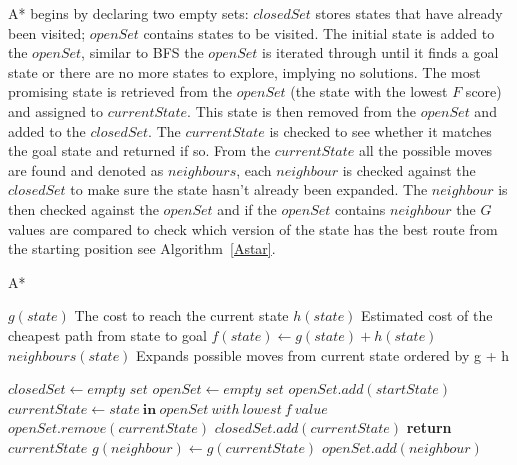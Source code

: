 \documentclass[final]{cmpreport}
\begin{document}
A* begins by declaring two empty sets: $closedSet$ stores states that have already been visited; $openSet$ contains states to be visited. The initial state is added to the $openSet$, similar to BFS the $openSet$ is iterated through until it finds a goal state or there are no more states to explore, implying no solutions. The most promising state is retrieved from the $openSet$ (the state with the lowest $F$ score) and assigned to $currentState$. This state is then removed from the $openSet$ and added to the $closedSet$. The $currentState$ is checked to see whether it matches the goal state and returned if so. From the $currentState$ all the possible moves are found and denoted as $neighbours$, each $neighbour$ is checked against the $closedSet$ to make sure the state hasn't already been expanded. The $neighbour$ is then checked against the $openSet$ and if the $openSet$ contains $neighbour$ the $G$ values are compared to check which version of the state has the best route from the starting position see Algorithm~\ref{Astar}.


	\begin{algorithm}
	\caption{A*}\label{Astar}
	\begin{algorithmic}[1]
		\State $g(state)$ \Comment The cost to reach the current state
		\State $h(state)$ \Comment Estimated cost of the cheapest path from state to goal
		\State $f(state) \gets g(state)+h(state)$
		\State $neighbours(state)$ \Comment Expands possible moves from current state ordered by g + h
		
		\State $closedSet \gets \textit{empty set}$
		\State $openSet \gets \textit{empty set}$
		\State $openSet.add(startState)$
		\State $currentState \gets state\   \textbf{in}\ openSet\ with\ lowest\ f\ value$
		\State $openSet.remove(currentState)$
		\State $closedSet.add(currentState)$
		\State \textbf{return} $currentState$
		\EndIf
		\State$g(neighbour) \gets g(currentState)$
		\EndIf	
		\Else
		\State $openSet.add(neighbour)$	
		\EndIf
		\EndIf
		
		\EndFor
		\EndWhile
		\EndProcedure
	\end{algorithmic}
\end{algorithm}
\end{document}
